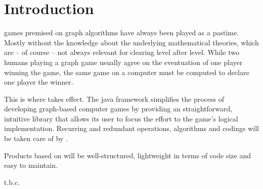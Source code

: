 \section{Introduction}
\Glspl{game} premised on \gls{graph} \glspl{algorithm} have always been played as a pastime. Mostly without the knowledge about the underlying mathematical theories, which are – of course – not always relevant for clearing \gls{level} after level. While two humans playing a graph game usually agree on the eventuation of one player winning the game, the same game on a computer must be computed to declare one \gls{player} the winner.\par

This is where {\graphioli} takes effect. The \Gls{java} \gls{framework} simplifies the process of developing graph-based computer games by providing an straightforward, intuitive \gls{library} that allows its user to focus the effort to the game's logical implementation. Recurring and redundant operations, algorithms and codings will be taken care of by {\graphioli}.\par

Products based on {\graphioli} will be well-structured, lightweight in terms of code size and easy to maintain.\par

t.b.c.